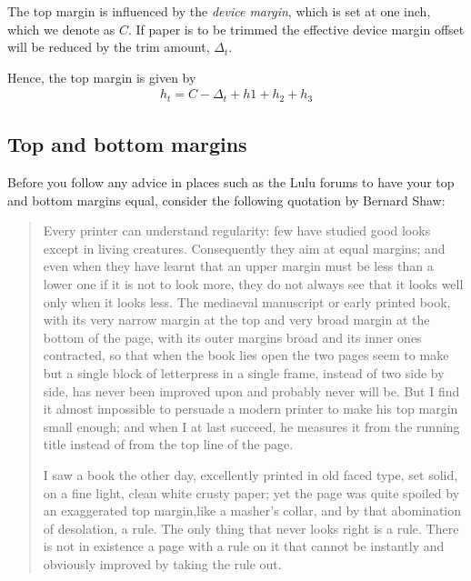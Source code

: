 The top margin is influenced by the \textit{device margin}, which is set at one inch, which we denote as $C$. If paper is to be trimmed the effective device margin offset will be reduced by the trim amount, $\Delta_t$.

Hence, the top margin is given by
\begin{align}
     h_t = C-\Delta_t+h1+h_2+h_3
\end{align}


\drawtriallayout


\printgeometryvalues
\readability

\newpage

\drawtriallayout

\readability

\newpage



\subsection{Top and bottom margins}

Before you follow any advice in places such as the Lulu forums to have your top and bottom margins equal, consider the following quotation by Bernard Shaw:

\begin{quotation}
Every printer can understand regularity: few have studied good looks except in living creatures. Consequently they aim at equal margins; and even when they have learnt that an upper margin must be less than a lower one if it is not to look more, they do not always see that it looks well only when it looks less. The mediaeval manuscript or early printed book, with its very narrow margin at the top and very broad margin at the bottom of the page, with its outer margins broad and its inner ones contracted, so that when the book lies open the two pages seem to make but a single block of letterpress in a single frame, instead of two side by side, has never been improved upon and probably never will be. But I find it almost impossible to persuade a modern printer to make his top margin small enough; and when I at last succeed, he measures it from the running title instead of from the top line of the page.

I saw a book the other day, excellently printed in old faced type, set solid, on a fine light, clean white crusty paper; yet the page was quite spoiled by an exaggerated top margin,like a masher's collar, and by that abomination of desolation, a rule. The only thing that never looks right is a rule. There is not in existence a page with a rule on it that cannot be instantly and obviously improved by taking the rule out.
\end{quotation}

